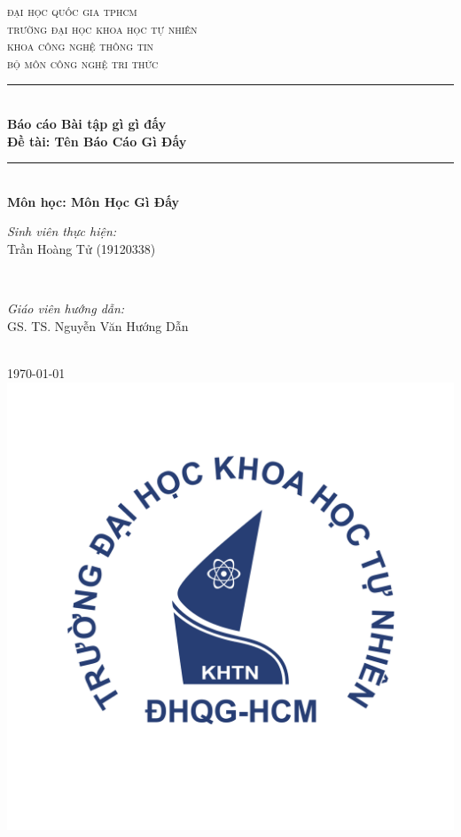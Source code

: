 \documentclass[12pt]{article}
\newcommand{\coursename}{Môn Học Gì Đấy}
\newcommand{\reportname}{Tên Báo Cáo Gì Đấy}
\begin{document}
\begin{titlepage}
\newcommand{\HRule}{\rule{\linewidth}{0.5mm}}
\centering

\textsc{\LARGE đại học quốc gia tphcm}\\[1.5cm]
\textsc{\Large trường đại học khoa học tự nhiên}\\[0.5cm]
\textsc{\large khoa công nghệ thông tin}\\[0.5cm]
\textsc{bộ môn công nghệ tri thức}\\[0.5cm]

\HRule \\[0.4cm]
{ 
\huge{\bfseries{Báo cáo Bài tập gì gì đấy}}\\[0.5cm]
\large{\bfseries{Đề tài: \reportname}}
}\\[0.4cm]
\HRule \\[0.5cm]

\textbf{\large Môn học: \coursename}\\[0.5cm]

\begin{minipage}[t]{0.4\textwidth}
\begin{flushleft} \large
\emph{Sinh viên thực hiện:}\\
Trần Hoàng Tử (19120338)
\end{flushleft}
\end{minipage}
~
\begin{minipage}[t]{0.4\textwidth}
\begin{flushright} \large
\emph{Giáo viên hướng dẫn:} \\
GS. TS. Nguyễn Văn Hướng Dẫn
\end{flushright}
\end{minipage}\\[2cm]

{\large \today}\\[2cm]

\includegraphics[scale=.3]{img/hcmus-logo.png}\\[1cm] 


\end{titlepage}
\end{document}
